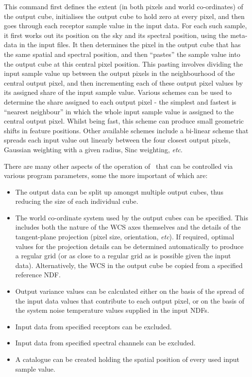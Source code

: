 \documentclass[oneside,11pt]{starlink}
\begin{document}
This command first defines the extent (in both pixels and world
co-ordinates) of the output cube, initialises the output cube to hold
zero at every pixel, and then goes through each receptor sample value in
the input data. For each such sample, it first works out its position on
the sky and its spectral position, using the meta-data in the input
files. It then determines the pixel in the output cube that has the same
spatial and spectral position, and then ``pastes'' the sample value into
the output cube at this central pixel position. This pasting involves
dividing the input sample value up between the output pixels in the
neighbourhood of the central output pixel, and then incrementing each of
these output pixel values by its assigned share of the input sample
value. Various schemes can be used to determine the share assigned to each
output pixel - the simplest and fastest is ``nearest neighbour'' in which
the whole input sample value is assigned to the central output pixel.
Whilst being fast, this scheme can produce small geometric shifts in
feature positions. Other available schemes include a bi-linear scheme
that spreads each input value out linearly between the four closest
output pixels, Gaussian weighting with a given radius, Sinc weighting,
\emph{etc}.

There are many other aspects of the operation of \makecube\ that can be
controlled via various program parameters, some the more important of
which are:

\begin{itemize}

\item The output data can be split up amongst multiple output cubes, thus
reducing the size of each individual cube.

\item The world co-ordinate system used by the output cubes can be
specified. This includes both the nature of the WCS axes themselves and
the details of the tangent-plane projection (pixel size, orientation,
\emph{etc}). If required, optimal values for the projection details can be
determined automatically to produce a regular grid (or as close to a
regular grid as is possible given the input data). Alternatively, the WCS
in the output cube be copied from a specified reference NDF.

\item Output variance values can be calculated either on the basis
of the spread of the input data values that contribute to each output pixel,
or on the basis of the system noise temperature values supplied in the
input NDFs.

\item Input data from specified receptors can be excluded.

\item Input data from specified spectral channels can be excluded.

\item A catalogue can be created holding the spatial position of every
used input sample value.

\end{itemize}
\end{document}
